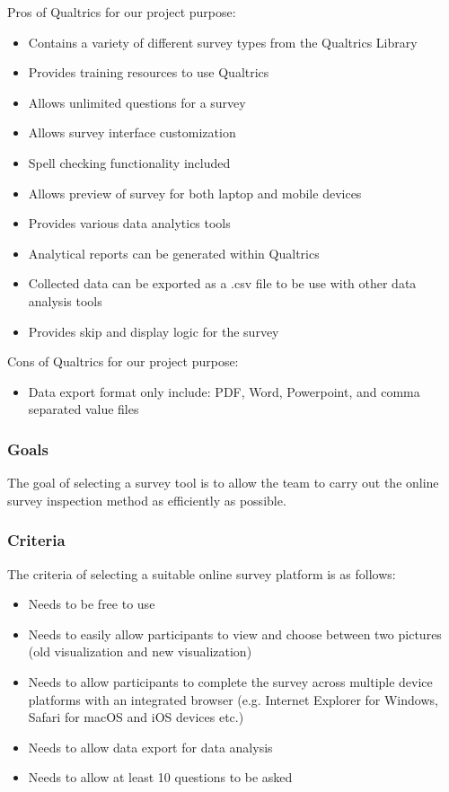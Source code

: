 \documentclass[10pt,journal,compsoc,draftclsnofoot]{IEEEtran}
\begin{document}
Pros of Qualtrics for our project purpose:
\begin{itemize}
\item Contains a variety of different survey types from the Qualtrics Library
\item Provides training resources to use Qualtrics
\item Allows unlimited questions for a survey
\item Allows survey interface customization
\item Spell checking functionality included
\item Allows preview of survey for both laptop and mobile devices
\item Provides various data analytics tools
\item Analytical reports can be generated within Qualtrics
\item Collected data can be exported as a .csv file to be use with other data analysis tools
\item Provides skip and display logic for the survey
\end{itemize}

Cons of Qualtrics for our project purpose:
\begin{itemize}
\item Data export format only include: PDF, Word, Powerpoint, and comma separated value files
\end{itemize}

\subsubsection{Goals}
The goal of selecting a survey tool is to allow the team to carry out the online survey inspection method as efficiently as possible.

\subsubsection{Criteria}
The criteria of selecting a suitable online survey platform is as follows:
\begin{itemize}
\item Needs to be free to use
\item Needs to easily allow participants to view and choose between two pictures (old visualization and new visualization)
\item Needs to allow participants to complete the survey across multiple device platforms with an integrated browser (e.g. Internet Explorer for Windows, Safari for macOS and iOS devices etc.)
\item Needs to allow data export for data analysis
\item Needs to allow at least 10 questions to be asked
\end{itemize}
\end{document}
